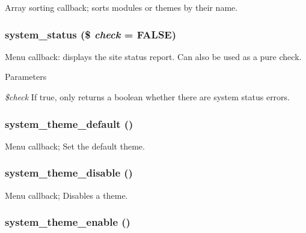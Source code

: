 \label{system_8admin_8inc_a8770f4f3651607a040ea5e73311ea2bd}
Array sorting callback; sorts modules or themes by their name. \hypertarget{system_8admin_8inc_ad24845c53f23e750918d3b1678bda951}{
\subsubsection[{system\_\-status}]{\setlength{\rightskip}{0pt plus 5cm}system\_\-status (\$ {\em check} = {\ttfamily FALSE})}}
\label{system_8admin_8inc_ad24845c53f23e750918d3b1678bda951}
Menu callback: displays the site status report. Can also be used as a pure check.


\begin{DoxyParams}{Parameters}
\item[{\em \$check}]If true, only returns a boolean whether there are system status errors. \end{DoxyParams}
\hypertarget{system_8admin_8inc_a3beefeae869b24502316eb523364ebca}{
\subsubsection[{system\_\-theme\_\-default}]{\setlength{\rightskip}{0pt plus 5cm}system\_\-theme\_\-default ()}}
\label{system_8admin_8inc_a3beefeae869b24502316eb523364ebca}
Menu callback; Set the default theme. \hypertarget{system_8admin_8inc_a3abc909740cb59ed14500cc93a519ad8}{
\subsubsection[{system\_\-theme\_\-disable}]{\setlength{\rightskip}{0pt plus 5cm}system\_\-theme\_\-disable ()}}
\label{system_8admin_8inc_a3abc909740cb59ed14500cc93a519ad8}
Menu callback; Disables a theme. \hypertarget{system_8admin_8inc_ad430bc3a50505142539601f4f7ba25e0}{
\subsubsection[{system\_\-theme\_\-enable}]{\setlength{\rightskip}{0pt plus 5cm}system\_\-theme\_\-enable ()}}
